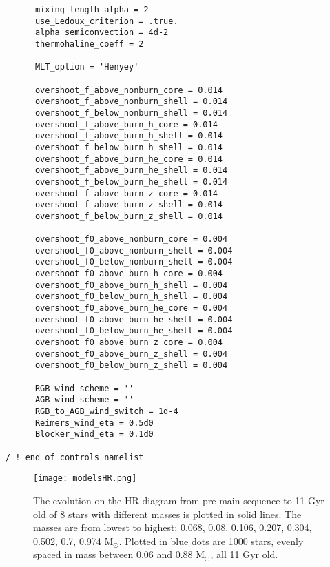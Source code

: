 \documentclass[useAMS,usenatbib]{mnras}
\begin{document}
\begin{table*}
\begin{multicols}{2}
{\begin{verbatim}
      mixing_length_alpha = 2
      use_Ledoux_criterion = .true.
      alpha_semiconvection = 4d-2
      thermohaline_coeff = 2

      MLT_option = 'Henyey'

      overshoot_f_above_nonburn_core = 0.014
      overshoot_f_above_nonburn_shell = 0.014
      overshoot_f_below_nonburn_shell = 0.014
      overshoot_f_above_burn_h_core = 0.014
      overshoot_f_above_burn_h_shell = 0.014
      overshoot_f_below_burn_h_shell = 0.014
      overshoot_f_above_burn_he_core = 0.014
      overshoot_f_above_burn_he_shell = 0.014
      overshoot_f_below_burn_he_shell = 0.014
      overshoot_f_above_burn_z_core = 0.014
      overshoot_f_above_burn_z_shell = 0.014
      overshoot_f_below_burn_z_shell = 0.014

      overshoot_f0_above_nonburn_core = 0.004
      overshoot_f0_above_nonburn_shell = 0.004
      overshoot_f0_below_nonburn_shell = 0.004
      overshoot_f0_above_burn_h_core = 0.004
      overshoot_f0_above_burn_h_shell = 0.004
      overshoot_f0_below_burn_h_shell = 0.004
      overshoot_f0_above_burn_he_core = 0.004
      overshoot_f0_above_burn_he_shell = 0.004
      overshoot_f0_below_burn_he_shell = 0.004
      overshoot_f0_above_burn_z_core = 0.004
      overshoot_f0_above_burn_z_shell = 0.004
      overshoot_f0_below_burn_z_shell = 0.004
      
      RGB_wind_scheme = ''
      AGB_wind_scheme = ''
      RGB_to_AGB_wind_switch = 1d-4
      Reimers_wind_eta = 0.5d0  
      Blocker_wind_eta = 0.1d0

/ ! end of controls namelist

\end{verbatim}
}
\end{multicols}
\end{table*}

\begin{figure}
\texttt{[image: modelsHR.png]}
\caption{The evolution on the HR diagram from pre-main sequence to 11 Gyr old of 8 stars with different masses is plotted in solid lines. The masses are from lowest to highest: 0.068, 0.08, 0.106, 0.207, 0.304, 0.502, 0.7, 0.974 M$_\odot$. Plotted in blue dots are 1000 stars, evenly spaced in mass between 0.06 and 0.88 M$_\odot$, all 11 Gyr old.}
\label{fig:models}
\end{figure}
\end{document}
